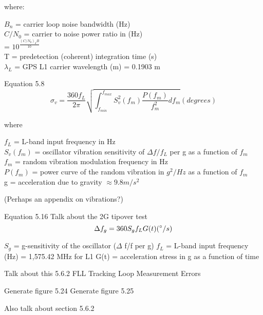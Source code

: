 where:
\begin{framed}
$B_n$ = carrier loop noise bandwidth (Hz) \\
$C/N_0$ = carrier to noise power ratio in (Hz) \\
= $10^\frac{(C/N_0)_dB}{10}$ \\
T = predetection (coherent) integration time (s) \\
$\lambda_L$ = GPS L1 carrier wavelength (m)
= 0.1903 m
\end{framed}
\cite{Kaplan} \cite{Jwo}


Equation 5.8
\begin{equation}
\sigma_v = \frac{360f_L}{2\pi}\sqrt{\int_{f_{min}}^{f_{max}} S^2_v(f_m) \frac{P(f_m)}{f^2_m} df_m} (degrees)
\end{equation}
\cite{Kaplan} \cite{Jwo}

where
\begin{framed}
$f_L$ = L-band input frequency in Hz \\
$S_v(f_m)$ = oscillator vibration sensitivity of $\Delta f/f_L$ per g as a function of $f_m$ \\
$f_m$ = random vibration modulation frequency in Hz \\
$P(f_m)$ = power curve of the random vibration in $g^2/Hz$ as a function of $f_m$ \\
g = acceleration due to gravity $\approx 9.8 m/s^2$
\end{framed}

(Perhaps an appendix on vibrations?)

Equation 5.16
Talk about the 2G tipover test
\begin{equation}
\Delta f_g = 360 S_g f_L G(t) (\degree/s)
\end{equation}
\cite{Kaplan}

$S_g$ = g-sensitivity of the oscillator ($\Delta$ f/f per g) 
$f_L$ = L-band input frequency (Hz)
= 1,575.42 MHz for L1
G(t) = acceleration stress in g as a function of time


Talk about this
5.6.2 FLL Tracking Loop Measurement Errors

Generate figure 5.24
Generate figure 5.25

Also talk about section 5.6.2






















